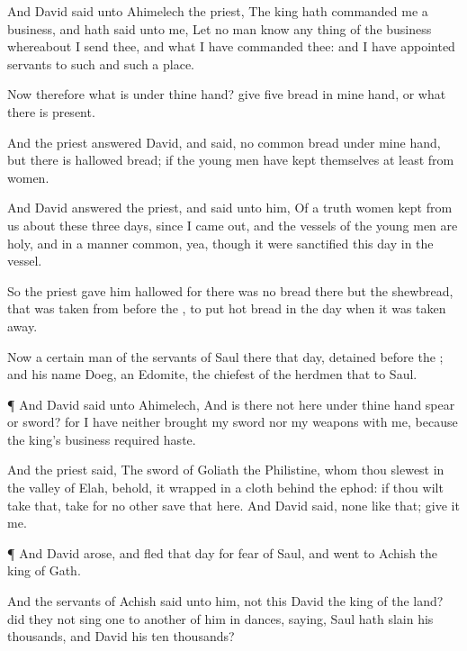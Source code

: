 {And
David
said unto
Ahimelech the
priest, The
king hath
commanded me a
business, and hath
said unto me, Let no
man
know any
thing of the
business whereabout I
send thee, and what I have
commanded thee: and I have
appointed
{}
servants to
such and
such a
place.

Now therefore what
is under thine
hand?
give
{}
five
{}
bread in mine
hand, or what there is
present.

And the
priest
answered
David, and
said,
{} no
common
bread under mine
hand, but there
is
hallowed
bread; if the young
men have
kept themselves at
least from
women.

And
David
answered the
priest, and
said unto him, Of a
truth
women
{}
kept from us about these
three
days, since I came
out, and the
vessels of the young
men are
holy, and
{} in a
manner
common, yea, though it were
sanctified this
day in the
vessel.

So the
priest
gave him
hallowed
{} for there was no
bread there but the
shewbread, that was
taken from
before the
{}, to
put
hot
bread in the
day when it was taken
away.

Now a certain
man of the
servants of
Saul
{} there that
day,
detained
before the
{}; and his
name
{}
Doeg, an
Edomite, the
chiefest of the
herdmen that
{} to
Saul.


\par }{\PP {}¶ And
David
said unto
Ahimelech, And is
there
not here under thine
hand
spear or
sword? for I have neither
brought my
sword nor my
weapons with
me, because the
king’s
business
required
haste.

And the
priest
said, The
sword of
Goliath the
Philistine, whom thou
slewest in the
valley of
Elah, behold, it
{}
wrapped in a
cloth
behind the
ephod: if thou wilt
take that,
take
{} for
{} no
other
save that
here. And
David
said,
{} none like that;
give it me.


\par }{\PP {}¶ And
David
arose, and
fled that
day for
fear of
Saul, and
went to
Achish the
king of
Gath.

And the
servants of
Achish
said unto him,
{} not this
David the
king of the
land? did they not
sing one to another of
him in
dances,
saying,
Saul hath
slain his
thousands, and
David his ten
thousands?

}
